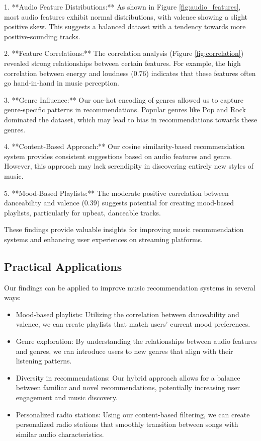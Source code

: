 \documentclass[runningheads]{llncs}
\begin{document}
1. **Audio Feature Distributions:** As shown in Figure \ref{fig:audio_features}, most audio features exhibit normal distributions, with valence showing a slight positive skew. This suggests a balanced dataset with a tendency towards more positive-sounding tracks.
    
2. **Feature Correlations:** The correlation analysis (Figure \ref{fig:correlation}) revealed strong relationships between certain features. For example, the high correlation between energy and loudness (0.76) indicates that these features often go hand-in-hand in music perception.
    
3. **Genre Influence:** Our one-hot encoding of genres allowed us to capture genre-specific patterns in recommendations. Popular genres like Pop and Rock dominated the dataset, which may lead to bias in recommendations towards these genres.
    
4. **Content-Based Approach:** Our cosine similarity-based recommendation system provides consistent suggestions based on audio features and genre. However, this approach may lack serendipity in discovering entirely new styles of music.
 
5. **Mood-Based Playlists:** The moderate positive correlation between danceability and valence (0.39) suggests potential for creating mood-based playlists, particularly for upbeat, danceable tracks.

These findings provide valuable insights for improving music recommendation systems and enhancing user experiences on streaming platforms.

\subsection{Practical Applications}
Our findings can be applied to improve music recommendation systems in several ways:
\begin{itemize}
    \item Mood-based playlists: Utilizing the correlation between danceability and valence, we can create playlists that match users' current mood preferences.
    \item Genre exploration: By understanding the relationships between audio features and genres, we can introduce users to new genres that align with their listening patterns.
    \item Diversity in recommendations: Our hybrid approach allows for a balance between familiar and novel recommendations, potentially increasing user engagement and music discovery.
    \item Personalized radio stations: Using our content-based filtering, we can create personalized radio stations that smoothly transition between songs with similar audio characteristics.
\end{itemize}
\end{document}
